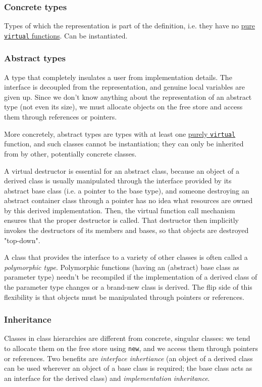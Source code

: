 \documentclass[8pt, table, xcdraw]{article}%
\begin{document}
\subsubsection{Concrete types}
Types of which the representation is part of the definition, i.e. they have no \hyperref[purevirtual]{pure \lstinline{virtual} functions}. Can be instantiated.

\subsubsection{Abstract types}
A type that completely insulates a user from implementation details. The interface is decoupled from the representation, and genuine local variables are given up. Since we don't know anything about the representation of an abstract type (not even its size), we must allocate objects on the free store and access them through references or pointers.

More concretely, abstract types are types with at least one \hyperref[purevirtual]{purely \lstinline{virtual}} function, and such classes cannot be instantiation; they can only be inherited from by other, potentially concrete classes.

A virtual destructor is essential for an abstract class, because an object of a derived class is usually manipulated through the interface provided by its abstract base class (i.e. a pointer to the base type), and someone destroying an abstract container class through a pointer has no idea what resources are owned by this derived implementation. Then, the virtual function call mechanism ensures that the proper destructor is called. That destructor then implicitly invokes the destructors of its members and bases, so that objects are destroyed "top-down".

A class that provides the interface to a variety of other classes is often called a \textit{polymorphic type}. Polymorphic functions (having an (abstract) base class as parameter type) needn't be recompiled if the implementation of a derived class of the parameter type changes or a brand-new class is derived. The flip side of this flexibility is that objects must be manipulated through pointers or references.

\subsubsection{Inheritance}

Classes in class hierarchies are different from concrete, singular classes: we tend to allocate them on the free store using \lstinline{new}, and we access them through pointers or references. Two benefits are \textit{interface inhertiance} (an object of a derived class can be used wherever an object of a base class is required; the base class acts as an interface for the derived class) and \textit{implementation inheritance}.
\end{document}
